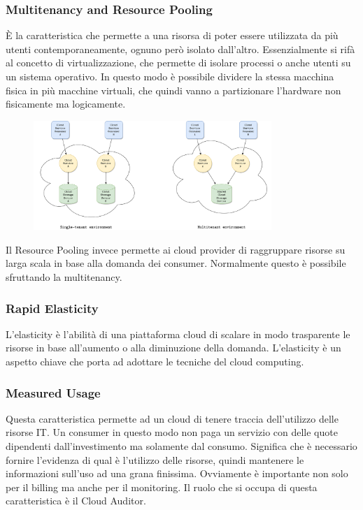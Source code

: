 \subsubsection{Multitenancy and Resource Pooling}
È la caratteristica che permette a una risorsa di poter essere utilizzata da più utenti contemporaneamente, ognuno però isolato dall'altro. Essenzialmente si rifà al concetto di virtualizzazione, che permette di isolare processi o anche utenti su un sistema operativo.
In questo modo è possibile dividere la stessa macchina fisica in più macchine virtuali, che quindi vanno a partizionare l'hardware non fisicamente ma logicamente.

\begin{figure}[ht]
    \centering
    \includegraphics[width=9cm]{./Images/cap3/3.2.png}
    \label{fig:image3.2}
\end{figure}


Il Resource Pooling invece permette ai cloud provider di raggruppare risorse su larga scala in base alla domanda dei consumer. Normalmente questo è possibile sfruttando la multitenancy.

\subsubsection{Rapid Elasticity}
L'elasticity è l'abilità di una piattaforma cloud di scalare in modo trasparente le risorse in base all'aumento o alla diminuzione della domanda. L'elasticity è un aspetto chiave che porta ad adottare le tecniche del cloud computing.

\subsubsection{Measured Usage}
Questa caratteristica permette ad un cloud di tenere traccia dell'utilizzo delle risorse IT. Un consumer in questo modo non paga un servizio con delle quote dipendenti dall'investimento ma solamente dal consumo. Significa che è necessario fornire l'evidenza di qual è l'utilizzo delle risorse, quindi mantenere le informazioni sull'uso ad una grana finissima. Ovviamente è importante non solo per il billing ma anche per il monitoring. Il ruolo che si occupa di questa caratteristica è il Cloud Auditor.
